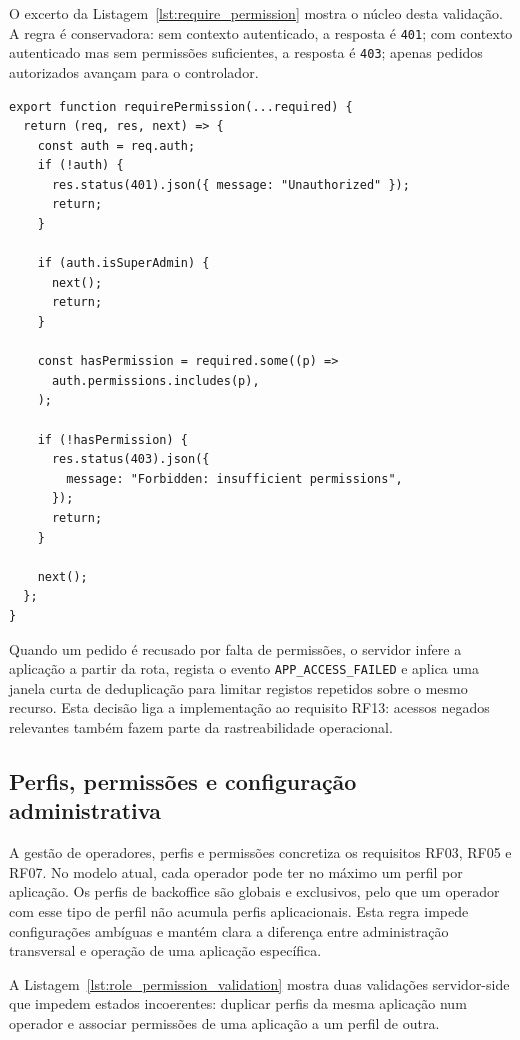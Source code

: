 O excerto da Listagem~\ref{lst:require_permission} mostra o núcleo desta validação. A regra é conservadora: sem contexto autenticado, a resposta é \texttt{401}; com contexto autenticado mas sem permissões suficientes, a resposta é \texttt{403}; apenas pedidos autorizados avançam para o controlador.

\begin{lstlisting}[float, caption={Validação de permissões no middleware \texttt{requirePermission}}, label={lst:require_permission}]
export function requirePermission(...required) {
  return (req, res, next) => {
    const auth = req.auth;
    if (!auth) {
      res.status(401).json({ message: "Unauthorized" });
      return;
    }

    if (auth.isSuperAdmin) {
      next();
      return;
    }

    const hasPermission = required.some((p) =>
      auth.permissions.includes(p),
    );

    if (!hasPermission) {
      res.status(403).json({
        message: "Forbidden: insufficient permissions",
      });
      return;
    }

    next();
  };
}
\end{lstlisting}

Quando um pedido é recusado por falta de permissões, o servidor infere a aplicação a partir da rota, regista o evento \texttt{APP\_ACCESS\_FAILED} e aplica uma janela curta de deduplicação para limitar registos repetidos sobre o mesmo recurso. Esta decisão liga a implementação ao requisito RF13: acessos negados relevantes também fazem parte da rastreabilidade operacional.

\subsection{Perfis, permissões e configuração administrativa}
\label{subsec:impl_roles_permissions}

A gestão de operadores, perfis e permissões concretiza os requisitos RF03, RF05 e RF07. No modelo atual, cada operador pode ter no máximo um perfil por aplicação. Os perfis de backoffice são globais e exclusivos, pelo que um operador com esse tipo de perfil não acumula perfis aplicacionais. Esta regra impede configurações ambíguas e mantém clara a diferença entre administração transversal e operação de uma aplicação específica.

A Listagem~\ref{lst:role_permission_validation} mostra duas validações servidor-side que impedem estados incoerentes: duplicar perfis da mesma aplicação num operador e associar permissões de uma aplicação a um perfil de outra.

